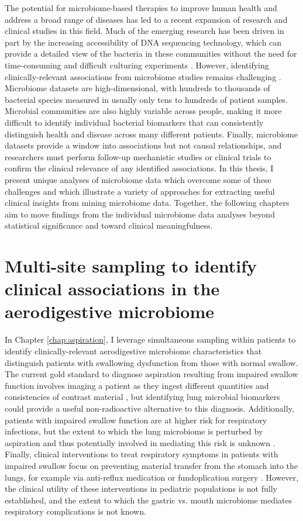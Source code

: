 The potential for microbiome-based therapies to improve human health and address a broad range of diseases has led to a recent expansion of research and clinical studies in this field.
Much of the emerging research has been driven in part by the increasing accessibility of DNA sequencing technology, which can provide a detailed view of the bacteria in these communities without the need for time-consuming and difficult culturing experiments \cite{hmp-2012}.
However, identifying clinically-relevant associations from microbiome studies remains challenging \cite{knights-2011-predictivevalue}.
Microbiome datasets are high-dimensional, with hundreds to thousands of bacterial species measured in usually only tens to hundreds of patient samples.
Microbial communities are also highly variable across people, making it more difficult to identify individual bacterial biomarkers that can consistently distinguish health and disease across many different patients.
Finally, microbiome datasets provide a window into associations but not causal relationships, and researchers must perform follow-up mechanistic studies or clinical trials to confirm the clinical relevance of any identified associations.
In this thesis, I present unique analyses of microbiome data which overcome some of these challenges and which illustrate a variety of approaches for extracting useful clinical insights from mining microbiome data.
Together, the following chapters aim to move findings from the individual microbiome data analyses beyond statistical significance and toward clinical meaningfulness.

\section{Multi-site sampling to identify clinical associations in the aerodigestive microbiome}

In Chapter \ref{chap:aspiration}, I leverage simultaneous sampling within patients to identify clinically-relevant aerodigestive microbiome characteristics that distinguish patients with swallowing dysfunction from those with normal swallow.
The current gold standard to diagnose aspiration resulting from impaired swallow function involves imaging a patient as they ingest different quantities and consistencies of contrast material \cite{cook-1999-dysphagia}, but identifying lung microbial biomarkers could provide a useful non-radioactive alternative to this diagnosis.
Additionally, patients with impaired swallow function are at higher risk for respiratory infections, but the extent to which the lung microbiome is perturbed by aspiration and thus potentially involved in mediating this risk is unknown \cite{cook-1999-dysphagia,thomson-2016-asppneumo}.
Finally, clinical interventions to treat respiratory symptoms in patients with impaired swallow focus on preventing material transfer from the stomach into the lungs, for example via anti-reflux medication or fundoplication surgery \cite{goldin-2006-fundo,lee-2008-fundo}.
However, the clinical utility of these interventions in pediatric populations is not fully established, and the extent to which the gastric vs. mouth microbiome mediates respiratory complications is not known.

